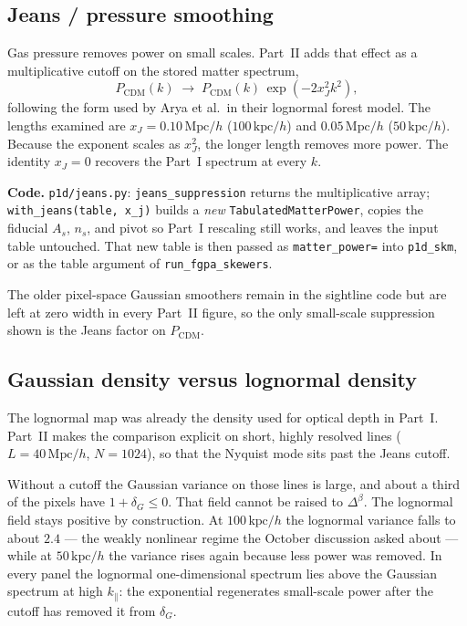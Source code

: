 \documentclass[11pt]{article}
\begin{document}
\subsection{Jeans / pressure smoothing}

Gas pressure removes power on small scales.
Part~II adds that effect as a multiplicative cutoff on the stored matter spectrum,
\begin{equation}
P_\mathrm{CDM}(k)\;\to\;P_\mathrm{CDM}(k)\,\exp(-2 x_J^{2} k^{2}),
\end{equation}
following the form used by Arya et al.\ in their lognormal forest model.
The lengths examined are $x_J=0.10\,\mathrm{Mpc}/h$ ($100\,\mathrm{kpc}/h$) and $0.05\,\mathrm{Mpc}/h$ ($50\,\mathrm{kpc}/h$).
Because the exponent scales as $x_J^{2}$, the longer length removes more power.
The identity $x_J=0$ recovers the Part~I spectrum at every $k$.

\textbf{Code.}
\texttt{p1d/jeans.py}:
\texttt{jeans\_suppression} returns the multiplicative array;
\texttt{with\_jeans(table, x\_j)} builds a \emph{new} \texttt{TabulatedMatterPower}, copies the fiducial $A_s$, $n_s$, and pivot so Part~I rescaling still works, and leaves the input table untouched.
That new table is then passed as \texttt{matter\_power=} into \texttt{p1d\_skm}, or as the table argument of \texttt{run\_fgpa\_skewers}.

The older pixel-space Gaussian smoothers remain in the sightline code but are left at zero width in every Part~II figure, so the only small-scale suppression shown is the Jeans factor on $P_\mathrm{CDM}$.

\subsection{Gaussian density versus lognormal density}

The lognormal map was already the density used for optical depth in Part~I.
Part~II makes the comparison explicit on short, highly resolved lines ($L=40\,\mathrm{Mpc}/h$, $N=1024$), so that the Nyquist mode sits past the Jeans cutoff.

Without a cutoff the Gaussian variance on those lines is large, and about a third of the pixels have $1+\delta_G\le 0$.
That field cannot be raised to $\Delta^{\beta}$.
The lognormal field stays positive by construction.
At $100\,\mathrm{kpc}/h$ the lognormal variance falls to about $2.4$ --- the weakly nonlinear regime the October discussion asked about --- while at $50\,\mathrm{kpc}/h$ the variance rises again because less power was removed.
In every panel the lognormal one-dimensional spectrum lies above the Gaussian spectrum at high $k_\parallel$: the exponential regenerates small-scale power after the cutoff has removed it from $\delta_G$.
\end{document}
